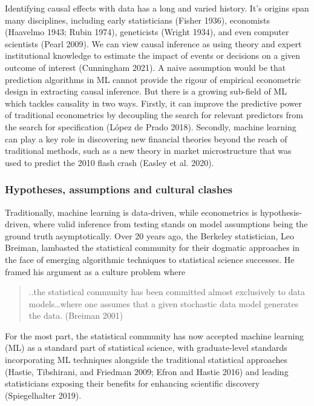 \documentclass{article}
\begin{document}
Identifying causal effects with data has a long and varied history. It's
origins span many disciplines, including early statisticians (Fisher
1936), economists (Haavelmo 1943; Rubin 1974), geneticists (Wright
1934), and even computer scientists (Pearl 2009). We can view causal
inference as using theory and expert institutional knowledge to estimate
the impact of events or decisions on a given outcome of interest
(Cunningham 2021). A naive assumption would be that prediction
algorithms in ML cannot provide the rigour of empirical econometric
design in extracting causal inference. But there is a growing sub-field
of ML which tackles causality in two ways. Firstly, it can improve the
predictive power of traditional econometrics by decoupling the search
for relevant predictors from the search for specification (López de
Prado 2018). Secondly, machine learning can play a key role in
discovering new financial theories beyond the reach of traditional
methods, such as a new theory in market microstructure that was used to
predict the 2010 flash crash (Easley et al. 2020).

\hypertarget{hypotheses-assumptions-and-cultural-clashes}{%
\subsubsection{Hypotheses, assumptions and cultural
clashes}\label{hypotheses-assumptions-and-cultural-clashes}}

Traditionally, machine learning is data-driven, while econometrics is
hypothesis-driven, where valid inference from testing stands on model
assumptions being the ground truth asymptotically. Over 20 years ago,
the Berkeley statistician, Leo Breiman, lambasted the statistical
community for their dogmatic approaches in the face of emerging
algorithmic techniques to statistical science successes. He framed his
argument as a culture problem where

\begin{quote}
..the statistical community has been committed almost exclusively to
data models\ldots where one assumes that a given stochastic data model
generates the data. (Breiman 2001)
\end{quote}

For the most part, the statistical community has now accepted machine
learning (ML) as a standard part of statistical science, with
graduate-level standards incorporating ML techniques alongside the
traditional statistical approaches (Hastie, Tibshirani, and Friedman
2009; Efron and Hastie 2016) and leading statisticians exposing their
benefits for enhancing scientific discovery (Spiegelhalter 2019).
\end{document}
